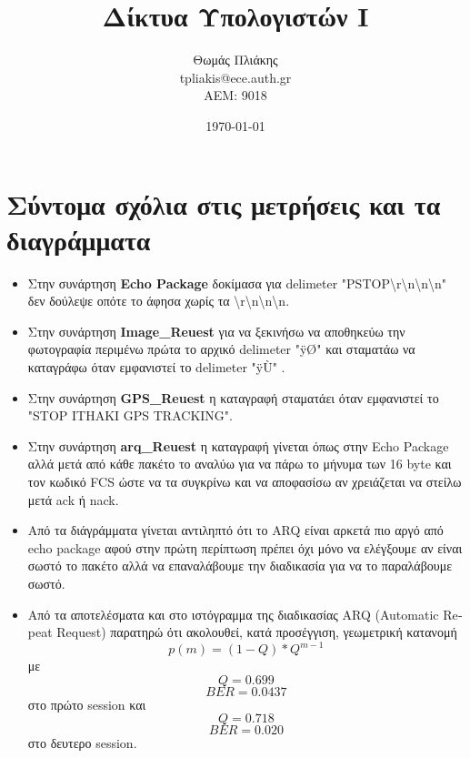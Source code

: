 \documentclass[10pt,a4paper]{article}
\title{ Δίκτυα Υπολογιστών Ι}
\author{Θωμάς Πλιάκης \\ \textlatin{tpliakis@ece.auth.gr} \\ AEM: 9018}
\date{\today}
\begin{document}
\maketitle

\section*{Σύντομα σχόλια στις μετρήσεις και τα διαγράμματα}
\begin{itemize}
  \item Στην συνάρτηση \textbf{\textlatin{Echo Package}} δοκίμασα για \textlatin{delimeter  "PSTOP\textbackslash r\textbackslash n\textbackslash n\textbackslash n"} δεν δούλεψε οπότε το άφησα χωρίς τα \textlatin{\textbackslash r\textbackslash n\textbackslash n\textbackslash n}.
  \item Στην συνάρτηση \textbf{\textlatin{Image\_Reuest}} για να ξεκινήσω να αποθηκεύω την φωτογραφία περιμένω πρώτα το αρχικό \textlatin{delimeter "ÿØ"} και σταματάω να καταγράφω όταν εμφανιστεί το \textlatin{delimeter "ÿÙ"  }.
  \item Στην συνάρτηση \textbf{\textlatin{GPS\_Reuest}} η καταγραφή σταματάει όταν εμφανιστεί το \textlatin{"STOP ITHAKI GPS TRACKING"}.
  \item Στην συνάρτηση \textbf{\textlatin{arq\_Reuest}} η καταγραφή γίνεται όπως στην \textlatin{Echo Package} αλλά μετά από κάθε πακέτο το αναλύω για να πάρω το μήνυμα των 16 \textlatin{byte} και τον κωδικό \textlatin{FCS} ώστε να τα συγκρίνω και να αποφασίσω αν χρειάζεται να στείλω μετά \textlatin{ack} ή \textlatin{nack}.
  \item Από τα διάγράμματα γίνεται αντιληπτό ότι το \textlatin{ARQ} είναι αρκετά πιο αργό από \textlatin{echo package} αφού στην πρώτη περίπτωση πρέπει όχι μόνο να ελέγξουμε αν είναι σωστό το πακέτο αλλά να επαναλάβουμε την διαδικασία για να το παραλάβουμε σωστό.
  \item Από τα αποτελέσματα και στο ιστόγραμμα της διαδικασίας \textlatin{ARQ (Automatic Repeat Request)} παρατηρώ ότι ακολουθεί, κατά προσέγγιση, γεωμετρική κατανομή
        \[p(m) = (1-Q)*Q^{m-1}\]
        με
        \[Q = 0.699\]
        \[BER = 0.0437 \]
        στο πρώτο \textlatin{session} και
        \[Q = 0.718 \]
        \[BER = 0.020 \]
        στο δευτερο \textlatin{session}.

\end{itemize}
\end{document}
